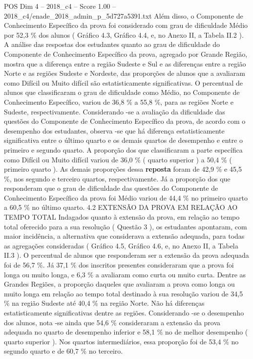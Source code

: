 \begin{textsample}{POS Dim 4 – 2018\_c4 – Score 1.00 – 2018\_c4/enade\_2018\_admin\_p\_5d727a5391.txt}
Além disso, o Componente de Conhecimento Específico da prova foi considerado com grau de dificuldade Médio por 52,3 \% dos alunos ( Gráfico 4.3, Gráfico 4.4, e, no Anexo II, a Tabela II.2 ).
A análise das respostas dos estudantes quanto ao grau de dificuldade do Componente de Conhecimento Específico da prova, agregado por Grande Região, mostra que a diferença entre a região Sudeste e Sul e as diferenças entre a região Norte e as regiões Sudeste e Nordeste, das proporções de alunos que a avaliaram como Difícil ou Muito difícil são estatisticamente significativas.
O percentual de alunos que classificaram o grau de dificuldade como Médio, no Componente de Conhecimento Específico, variou de 36,8 \% a 55,8 \%, para as regiões Norte e Sudeste, respectivamente.
Considerando -se a avaliação da dificuldade das questões do Componente de Conhecimento Específico da prova, de acordo com o desempenho dos estudantes, observa -se que há diferença estatisticamente significativa entre o último quarto e os demais quartos de desempenho e entre o primeiro e segundo quarto.
A proporção dos que classificaram a parte específica como Difícil ou Muito difícil variou de 36,0 \% ( quarto superior ) a 50,4 \% ( primeiro quarto ).
As demais proporções dessa \textbf{reposta} foram de 42,9 \% e 45,5 \%, nos segundo e terceiro quartos, respectivamente.
Já a proporção dos que responderam que o grau de dificuldade das questões do Componente de Conhecimento Específico da prova foi Médio variou de 44,4 \% no primeiro quarto a 60,5 \% no último quarto. 4.2 EXTENSÃO DA PROVA EM RELAÇÃO AO TEMPO TOTAL Indagados quanto à extensão da prova, em relação ao tempo total oferecido para a sua resolução ( Questão 3 ), os estudantes apontaram, com maior incidência, a alternativa que considerava a extensão adequada, para todas as agregações consideradas ( Gráfico 4.5, Gráfico 4.6, e, no Anexo II, a Tabela II.3 ).
O percentual de alunos que responderam ser a extensão da prova adequada foi de 56,7 \%.
Já 37,1 \% dos inscritos presentes consideraram que a prova foi longa ou muito longa, e 6,3 \% a avaliaram como curta ou muito curta.
Dentre as Grandes Regiões, a proporção daqueles que avaliaram a prova como longa ou muito longa em relação ao tempo total destinado à sua resolução variou de 34,5 \% na região Sudeste até 40,4 \% na região Norte.
Não há diferenças estatisticamente significativas dentre as regiões.
Considerando -se o desempenho dos alunos, nota -se ainda que 54,6 \% consideraram a extensão da prova adequada no quarto de desempenho inferior e 58,1 \% no de melhor desempenho ( quarto superior ).
Nos quartos intermediários, essa proporção foi de 53,4 \% no segundo quarto e de 60,7 \% no terceiro.

\end{textsample}
